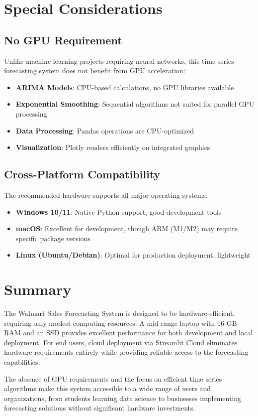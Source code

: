 \section*{Special Considerations}

\subsection*{No GPU Requirement}

Unlike machine learning projects requiring neural networks, this time series forecasting system does not benefit from GPU acceleration:

\begin{itemize}
	\item \textbf{ARIMA Models}: CPU-based calculations, no GPU libraries available
	\item \textbf{Exponential Smoothing}: Sequential algorithms not suited for parallel GPU processing
	\item \textbf{Data Processing}: Pandas operations are CPU-optimized
	\item \textbf{Visualization}: Plotly renders efficiently on integrated graphics
\end{itemize}

\subsection*{Cross-Platform Compatibility}

The recommended hardware supports all major operating systems:

\begin{itemize}
	\item \textbf{Windows 10/11}: Native Python support, good development tools
	\item \textbf{macOS}: Excellent for development, though ARM (M1/M2) may require specific package versions
	\item \textbf{Linux (Ubuntu/Debian)}: Optimal for production deployment, lightweight
\end{itemize}

\section*{Summary}

The Walmart Sales Forecasting System is designed to be hardware-efficient, requiring only modest computing resources. A mid-range laptop with 16 GB RAM and an SSD provides excellent performance for both development and local deployment. For end users, cloud deployment via Streamlit Cloud eliminates hardware requirements entirely while providing reliable access to the forecasting capabilities.

The absence of GPU requirements and the focus on efficient time series algorithms make this system accessible to a wide range of users and organizations, from students learning data science to businesses implementing forecasting solutions without significant hardware investments.
